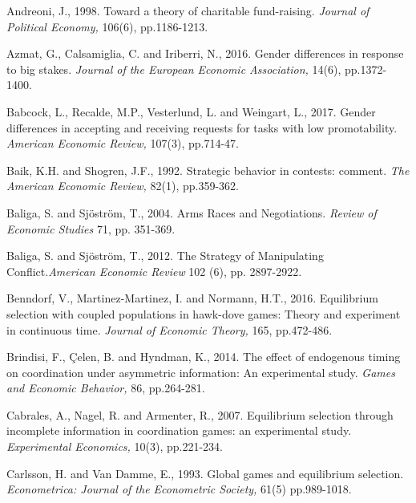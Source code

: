 \documentclass[12pt,english]{article}
\begin{document}
\newpage
\begin{thebibliography}{10}

\bibitem{} Andreoni, J., 1998. Toward a theory of charitable fund-raising. \textit{Journal of Political Economy,} 106(6), pp.1186-1213.

\bibitem{} Azmat, G., Calsamiglia, C. and Iriberri, N., 2016. Gender differences in response to big stakes. \textit{Journal of the European Economic Association,} 14(6), pp.1372-1400.

\bibitem{} Babcock, L., Recalde, M.P., Vesterlund, L. and Weingart, L., 2017. Gender differences in accepting and receiving requests for tasks with low promotability. \textit{American Economic Review,} 107(3), pp.714-47.

\bibitem{} Baik, K.H. and Shogren, J.F., 1992. Strategic behavior in contests: comment. \textit{The American Economic Review,} 82(1), pp.359-362.

  Baliga, S. and Sj\"ostr\"om, T., 2004. Arms Races and Negotiations. \textit{Review of Economic Studies} 71, pp. 351-369.





  Baliga, S. and Sj\"ostr\"om, T., 2012. The Strategy of Manipulating Conflict.\textit{American Economic Review} 102 (6), pp. 2897-2922.

 Benndorf, V., Martinez-Martinez, I. and Normann, H.T., 2016. Equilibrium selection with coupled populations in hawk-dove games: Theory and experiment in continuous time. \textit{Journal of Economic Theory,} 165, pp.472-486.

 Brindisi, F., \c{C}elen, B. and Hyndman, K., 2014. The effect of endogenous timing on coordination under asymmetric information: An experimental study. \textit{Games and Economic Behavior,} 86, pp.264-281.

\bibitem{} Cabrales, A., Nagel, R. and Armenter, R., 2007. Equilibrium selection through incomplete information in coordination games: an experimental study. \textit{Experimental Economics,} 10(3), pp.221-234.

\bibitem{} Carlsson, H. and Van Damme, E., 1993. Global games and equilibrium selection. \textit{Econometrica: Journal of the Econometric Society,} 61(5) pp.989-1018.


\end{thebibliography}
\end{document}
